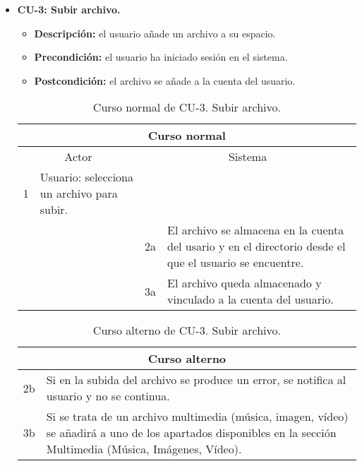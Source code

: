 \begin{itemize}
	\item \textbf{CU-3: Subir archivo.}
	\begin{itemize}
		\item \textbf{Descripción:} el usuario añade un archivo a su espacio.
		\item \textbf{Precondición:} el usuario ha iniciado sesión en el sistema.
		\item \textbf{Postcondición:} el archivo se añade a la cuenta del usuario.
	\end{itemize}
	\begin{table}[H]
		\centering
		\begin{tabular}{|p{0.3cm}|p{5cm}|p{0.3cm}|p{5cm}|}
			\hline
			\multicolumn{4}{|c|}{Curso normal} \\ \hline
			\multicolumn{2}{|c|}{Actor} & \multicolumn{2}{|c|}{Sistema} \\ \hline
			1 & Usuario: selecciona un archivo para subir. &  &  \\ \hline
			&  & 2a & El archivo se almacena en la cuenta del usario y en el directorio desde el que el usuario se encuentre. \\ \hline
			&  & 3a & El archivo queda almacenado y vinculado a la cuenta del usuario. \\ \hline
		\end{tabular}
		\caption{Curso normal de CU-3. Subir archivo.}
		\label{tabla:cu3-normal}
	\end{table}
	
	\begin{table}[H]
		\centering
		\begin{tabular}{|p{0.3cm}|p{10cm}|}
			\hline
			\multicolumn{2}{|c|}{Curso alterno} \\ \hline
			2b & Si en la subida del archivo se produce un error, se notifica al usuario y no se continua. \\ \hline
			3b & Si se trata de un archivo multimedia (música, imagen, vídeo) se añadirá a uno de los apartados disponibles en la sección Multimedia (Música, Imágenes, Vídeo). \\ \hline
		\end{tabular}
		\caption{Curso alterno de CU-3. Subir archivo.}
		\label{tabla:cu3-alterno}
	\end{table}
\end{itemize}

